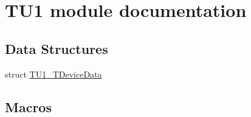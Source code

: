 \hypertarget{group___t_u1__module}{\section{T\-U1 module documentation}
\label{group___t_u1__module}
}
\subsection*{Data Structures}
\begin{DoxyCompactItemize}
\item 
struct \hyperlink{struct_t_u1___t_device_data}{T\-U1\-\_\-\-T\-Device\-Data}
\end{DoxyCompactItemize}
\subsection*{Macros}
